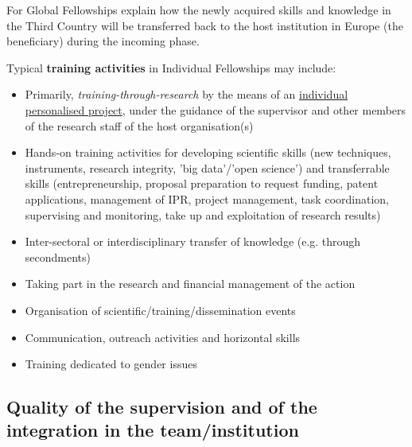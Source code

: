 \noindent
For Global Fellowships explain how the newly acquired skills and knowledge in the Third Country will be transferred back to the host institution in Europe (the beneficiary) during the incoming phase.

\medskip\noindent
Typical \textbf{training activities} in Individual Fellowships may include:
\begin{itemize}
\item Primarily, \emph{training-through-research} by the means of an \ul{individual personalised
project}, under the guidance of the supervisor and other members of the research
staff of the host organisation(s)
\item Hands-on training activities for developing scientific skills (new techniques,
instruments, research integrity, 'big data'/'open science') and transferrable skills
(entrepreneurship, proposal preparation to request funding, patent applications,
management of IPR, project management, task coordination, supervising and
monitoring, take up and exploitation of research results)
\item Inter-sectoral or interdisciplinary transfer of knowledge (e.g. through secondments)
\item Taking part in the research and financial management of the action
\item Organisation of scientific/training/dissemination events
\item Communication, outreach activities and horizontal skills
\item Training dedicated to gender issues
\end{itemize}




\subsection{Quality of the supervision and of the integration in the team/institution}
\label{sec:excellence_supervision}

